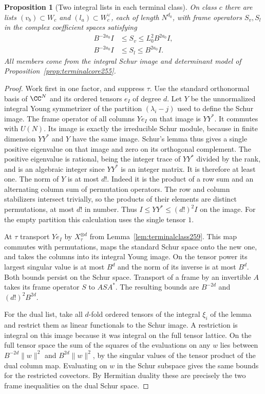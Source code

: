 \documentclass[a4paper,11pt]{article}
\newtheorem{proposition}{Proposition}[section]
\theoremstyle{definition}
\theoremstyle{remark}
\numberwithin{equation}{section}
\begin{document}
\begin{proposition}[Two integral lists in each terminal class]\leavevmode
\label{prop:schurframe259}
On class \(c\) there are lists \((v_b)\subset W_c\) and
\((l_a)\subset W_c^\vee\), each of length \(N^{d_0}\), with
frame operators \(S_v,S_l\) in the complex coefficient spaces
satisfying
\[
 \begin{aligned}
 B^{-2a_0}I&\le S_v\le L_0^2B^{2a_0}I,\\
 B^{-2a_0}I&\le S_l\le B^{2a_0}I .
 \end{aligned}
\]
All members come from the integral Schur image and determinant
model of Proposition~\ref{prop:terminalcore255}.
\end{proposition}
\begin{proof}
Work first in one factor, and suppress \(\tau\).
Use the standard orthonormal basis of \(\CC^N\) and its
ordered tensors \(e_I\) of degree \(d\). Let \(Y\) be the
unnormalized integral Young symmetrizer of the partition
\((\lambda_i-j)\) used to define the Schur image. The frame
operator of all columns \(Ye_I\) on that image is \(YY^*\).
It commutes with \(U(N)\). Its image is exactly the
irreducible Schur module, because in finite dimension
\(YY^*\) and \(Y\) have the same image. Schur's lemma thus
gives a single positive eigenvalue on that image and zero on
its orthogonal complement. The positive eigenvalue is rational,
being the integer trace of \(YY^*\) divided by the rank, and
is an algebraic integer since \(YY^*\) is an integer matrix.
It is therefore at least one. The norm of \(Y\) is at most
\(d!\). Indeed it is the product of a row sum and an alternating
column sum of permutation operators. The row and column
stabilizers intersect trivially, so the products of their
elements are distinct permutations, at most \(d!\) in number.
Thus \(I\le YY^*\le(d!)^2 I\) on the image. For the empty
partition this calculation uses the single tensor \(1\).

At \(\tau\) transport \(Ye_I\) by \(X_\tau^{\otimes d}\)
from Lemma~\ref{lem:terminalclass259}. This map commutes
with permutations, maps the standard Schur space onto the
new one, and takes the columns into its integral Young
image. On the tensor power its largest singular value is at
most \(B^d\) and the norm of its inverse is at most \(B^d\).
Both bounds persist on the Schur space. Transport of a frame
by an invertible \(A\) takes its frame operator \(S\) to
\(ASA^*\). The resulting bounds are \(B^{-2d}\) and
\((d!)^2B^{2d}\).

For the dual list, take all \(d\)-fold ordered tensors of
the integral \(\xi_i\) of the lemma and restrict them as
linear functionals to the Schur image. A restriction is
integral on this image because it was integral on the full
tensor lattice. On the full tensor space the sum of the
squares of the evaluations on any \(w\) lies between
\(B^{-2d}\|w\|^2\) and \(B^{2d}\|w\|^2\), by the singular
values of the tensor product of the dual column map.
Evaluating on \(w\) in the Schur subspace gives the same
bounds for the restricted covectors. By Hermitian duality
these are precisely the two frame inequalities on the
dual Schur space.


\end{proof}
\end{document}
